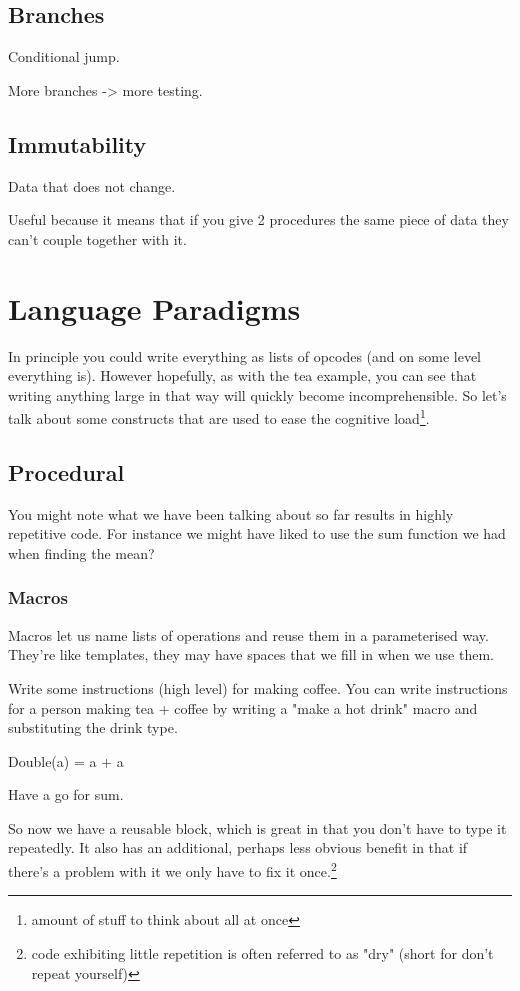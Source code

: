 \documentclass{article}
\begin{document}
\subsection{Branches}
Conditional jump.

More branches -> more testing.

\subsection{Immutability}
Data that does not change.

Useful because it means that if you give 2 procedures the same piece of data they
can't couple together with it.

\section{Language Paradigms}
In principle you could write everything as lists of opcodes (and on some level
everything is). However hopefully, as with the tea example, you can see that
writing anything large in that way will quickly become incomprehensible.
So let's talk about some constructs that are used to ease the cognitive
load\footnote{amount of stuff to think about all at once}.
\subsection{Procedural}
You might note what we have been talking about so far results in highly
repetitive code.  For instance we might have liked to use the sum function we
had when finding the mean?
\subsubsection{Macros}
Macros let us name lists of operations and reuse them in a parameterised way.
They're like templates, they may have spaces that we fill in when we use them.

Write some instructions (high level) for making coffee.
You can write instructions for a person making tea + coffee by writing a "make
a hot drink" macro and substituting the drink type.

Double(a) = a + a

Have a go for sum.

So now we have a reusable block, which is great in that you don't have to type
it repeatedly.  It also has an additional, perhaps less obvious benefit in that
if there's a problem with it we only have to fix it once.\footnote{
code exhibiting little repetition is often referred to as "dry" (short for
don't repeat yourself)}
\end{document}
